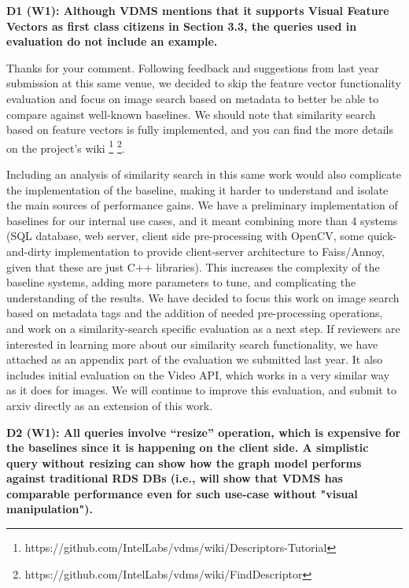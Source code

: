 \documentclass[11pt]{proposalnsf}
\begin{document}
\noindent %
\textbf{
D1 (W1): Although VDMS mentions that it supports Visual Feature Vectors as
first class citizens in Section 3.3, the queries used in evaluation
do not include an example.
}\bigskip

Thanks for your comment.
Following feedback and suggestions from last year submission at this same venue,
we decided to skip the feature vector functionality evaluation and
focus on image search based on metadata to better be able to compare
against well-known baselines.
We should note that similarity search based on feature vectors
is fully implemented, and you can find the more details on the project's wiki
\footnote{https://github.com/IntelLabs/vdms/wiki/Descriptors-Tutorial}
\footnote{https://github.com/IntelLabs/vdms/wiki/FindDescriptor}.

Including an analysis of similarity search in this same work would also
complicate the implementation of the baseline, making it harder to understand
and isolate the main sources of performance gains.
We have a preliminary implementation of baselines for our internal use cases,
and it meant combining more than 4 systems (SQL database, web server, client side
pre-processing with OpenCV, some quick-and-dirty implementation
to provide client-server architecture to Faiss/Annoy, given that these
are just C++ libraries).
This increases the complexity of the baseline systems, adding
more parameters to tune, and complicating the understanding of the results.
We have decided to focus this work on image search based on metadata tags
and the addition of needed pre-processing operations, and
work on a similarity-search specific evaluation as a next step.
If reviewers are interested in learning more about our similarity search functionality,
we have attached as an appendix part of the evaluation we submitted last year.
It also includes initial evaluation on the Video API, which works in a very
similar way as it does for images.
We will continue to improve this evaluation, and submit to arxiv directly
as an extension of this work.

\bigskip
\noindent %
\textbf{
D2 (W1): All queries involve “resize” operation, which is expensive for the
baselines since it is happening on the client side.
A simplistic query without resizing can show how the graph model performs
against traditional RDS DBs (i.e., will show that VDMS has comparable
performance even for such use-case without "visual manipulation").
}\bigskip
\end{document}
